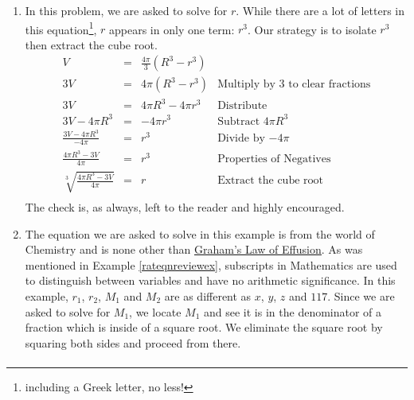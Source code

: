 \documentclass{ximera}
\begin{document}
\begin{example}
\begin{explanation}
\begin{enumerate}
\[\begin{array}{rclr}
\end{array} \]

At this point, the Zero Product Property gives either $n^2 - 2 = 0$ or $n^2 + 1 = 0$.  From $n^2 - 2 = 0$, we get $n^2 = 2$, so $n = \pm \sqrt{2}$.  From $n^2 + 1 = 0$, we get $n^2 = -1$, which gives no real solutions.\footnote{Why is that again?}  Since we raised both sides to an even (the fourth) power, we need to check for extraneous solutions. We find that $n = -\sqrt{2}$ works but $n = \sqrt{2}$ is extraneous.

\item In this problem, we are asked to solve for $r$. While there are a lot of letters in this equation\footnote{including a Greek letter, no less!}, $r$ appears in only one term:  $r^3$.  Our strategy is to isolate $r^3$ then extract the cube root.\[ \begin{array}{rclr}

V & = & \frac{4\pi}{3}(R^3 - r^3) & \\  

3V & = & 4\pi (R^3 - r^3) &  \text{Multiply by $3$ to clear fractions}\\ 

3V & = & 4\pi R^3 - 4\pi r^3 & \text{Distribute} \\ 

3V - 4\pi R^3 & = & -4 \pi r^3 & \text{Subtract $4 \pi R^3$} \\ 

\frac{3V - 4\pi R^3}{-4\pi} & = & r^3 & \text{Divide by $-4\pi$} \\ 

\frac{4\pi R^3 - 3V}{4\pi} & = & r^3 & \text{Properties of Negatives} \\ 

\sqrt[3]{\frac{4\pi R^3 - 3V}{4\pi}} & = & r & \text{Extract the cube root} \\

\end{array} \] The check is, as always, left to the reader and highly encouraged.

\item  The equation we are asked to solve in this example is from the world of Chemistry and is none other than \href{http://en.wikipedia.org/wiki/Graham's_law}{\underline{Graham's Law of Effusion}}.  As was mentioned in Example \ref{rateqnreviewex}, subscripts in Mathematics are used to distinguish between variables and have no arithmetic significance.  In this example, $r_1$, $r_2$, $M_1$ and $M_2$ are as different as $x$, $y$, $z$ and $117$.  Since we are asked to solve for $M_1$, we locate $M_1$ and see it is in the denominator of a fraction which is inside of a square root.  We eliminate the square root by squaring both sides and proceed from there.  \[ \begin{array}{rclr}


\end{array}\]
\end{enumerate}
\end{explanation}
\end{example}
\end{document}
